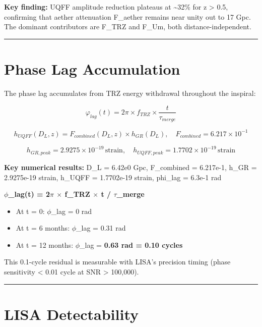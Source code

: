 \documentclass[12pt,a4paper]{article}
\begin{document}
\textbf{Key finding:} UQFF amplitude reduction plateaus at \textasciitilde{}32\% for z > 0.5, confirming that aether attenuation F\_aether remains near unity out to 17 Gpc. The dominant contributors are F\_TRZ and F\_Um, both distance-independent.

\medskip\hrule\medskip

\section{Phase Lag Accumulation}

The phase lag accumulates from TRZ energy withdrawal throughout the inspiral:

\begin{equation}
\varphi_{lag}(t) = 2\pi \times f_{TRZ} \times \frac{t}{\tau_{merge}}
\end{equation}

\begin{equation}
h_{UQFF}(D_L, z) = F_{combined}(D_L, z) \times h_{GR}(D_L),\quad F_{combined} = 6.217\times10^{-1}
\end{equation}

\begin{equation}
h_{GR,peak} = 2.9275\times10^{-19}\,\mathrm{strain},\quad h_{UQFF,peak} = 1.7702\times10^{-19}\,\mathrm{strain}
\end{equation}

\textbf{Key numerical results:} D\_L = 6.42e0 Gpc, F\_combined = 6.217e-1, h\_GR = 2.9275e-19 strain, h\_UQFF = 1.7702e-19 strain, phi\_lag = 6.3e-1 rad

\textbf{$\phi$\_lag(t) = 2$\pi$ $\times$ f\_TRZ $\times$ t / $\tau$\_merge}

\begin{itemize}
  \item At t = 0: $\phi$\_lag = 0 rad  
  \item At t = 6 months: $\phi$\_lag = 0.31 rad  
  \item At t = 12 months: $\phi$\_lag = \textbf{0.63 rad = 0.10 cycles}
\end{itemize}

This 0.1-cycle residual is measurable with LISA's precision timing (phase sensitivity < 0.01 cycle at SNR > 100,000).

\medskip\hrule\medskip

\section{LISA Detectability}
\end{document}
